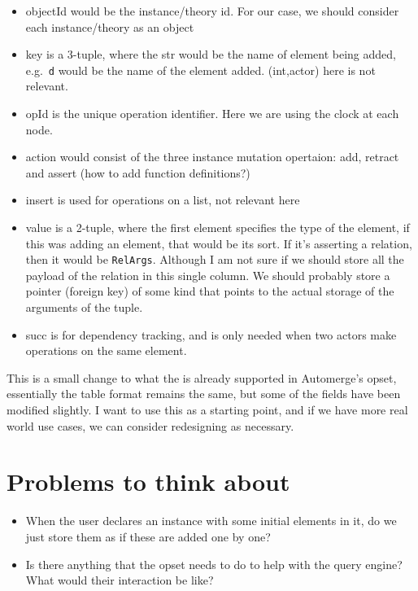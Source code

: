 \documentclass[12pt,a4paper,twoside]{article}
\begin{document}
\begin{itemize}
  \item objectId would be the instance/theory id. For our case, we should consider each instance/theory 
  as an object
  \item key is a 3-tuple, where the str would be the name of element being added, 
  e.g.\ \verb|d| would be the name of the element added\@. (int,actor) here is
  not relevant.
  \item opId is the unique operation identifier. Here we are using the clock at
  each node.
  \item action would consist of the three instance mutation opertaion: add, retract and assert
  (how to add function definitions?)
  \item insert is used for operations on a list, not relevant here
  \item value is a 2-tuple, where the first element specifies the type of the element,
  if this was adding an element, that would be its sort. If it's asserting a relation,
  then it would be \verb|RelArgs|. Although I am not sure if we should store all the payload
  of the relation in this single column. We should probably store a pointer (foreign key)
  of some kind that points to the actual storage of the arguments of the tuple.
  \item succ is for dependency tracking, and is only needed when two actors make
  operations on the same element.
\end{itemize}

This is a small change to what the is already supported in Automerge's opset,
essentially the table format remains the same, but some of the fields have been
modified slightly. I want to use this as a starting point, and if we have more
real world use cases, we can consider redesigning as necessary. 


\section{Problems to think about}

\begin{itemize}
  \item When the user declares an instance with some initial elements in it, do we
  just store them as if these are added one by one?
  \item Is there anything that the opset needs to do to help with the query engine?
  What would their interaction be like?
\end{itemize}






\end{document}
